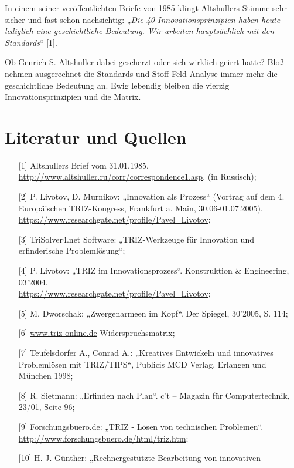 \documentclass[11pt,a4paper]{article}
\begin{document}
In einem seiner veröffentlichten Briefe von 1985 klingt Altshullers Stimme
sehr sicher und fast schon nachsichtig: „\emph{Die 40 Innovationsprinzipien
  haben heute lediglich eine geschichtliche Bedeutung. Wir arbeiten
  hauptsächlich mit den Standards}“ [1].

Ob Genrich S. Altshuller dabei gescherzt oder sich wirklich geirrt hatte? Bloß
nehmen ausgerechnet die Standards und Stoff-Feld-Analyse immer mehr die
geschichtliche Bedeutung an. Ewig lebendig bleiben die vierzig
Innovationsprinzipien und die Matrix.

\section*{Literatur und Quellen}
\begin{itemize}
\item[{[1]}] Altshullers Brief vom 31.01.1985,\\
  \url{http://www.altshuller.ru/corr/correspondence1.asp}, (in Russisch);
\item[{[2]}] P. Livotov, D. Murnikov: „Innovation als Prozess“ (Vortrag auf
  dem 4. Europäischen TRIZ-Kongress, Frankfurt a. Main, 30.06-01.07.2005).\\ 
  \url{https://www.researchgate.net/profile/Pavel_Livotov};
\item[{[3]}] TriSolver4.net Software: „TRIZ-Werkzeuge für Innovation und
  erfinderische Problem\-lösung“;
\item[{[4]}] P. Livotov: „TRIZ im Innovationsprozess“. Konstruktion \&
  Engineering, 03'2004.\\
  \url{https://www.researchgate.net/profile/Pavel_Livotov};
\item[{[5]}] M. Dworschak: „Zwergenarmeen im Kopf“. Der Spiegel, 30’2005,
  S. 114;
\item[{[6]}] \url{www.triz-online.de} Widerspruchsmatrix;
\item[{[7]}] Teufelsdorfer A., Conrad A.: „Kreatives Entwickeln und
  innovatives Problemlösen mit TRIZ/TIPS“, Publicis MCD Verlag, Erlangen und
  München 1998;
\item[{[8]}] R. Sietmann: „Erfinden nach Plan“. c't -- Magazin für
  Computertechnik, 23/01, Seite 96;
\item[{[9]}] Forschungsbuero.de: „TRIZ - Lösen von technischen Problemen“.\\
  \url{http://www.forschungsbuero.de/html/triz.htm};
\item[{[10]}] H.-J. Günther: „Rechnergestützte Bearbeitung von innovativen

\end{itemize}
\end{document}
